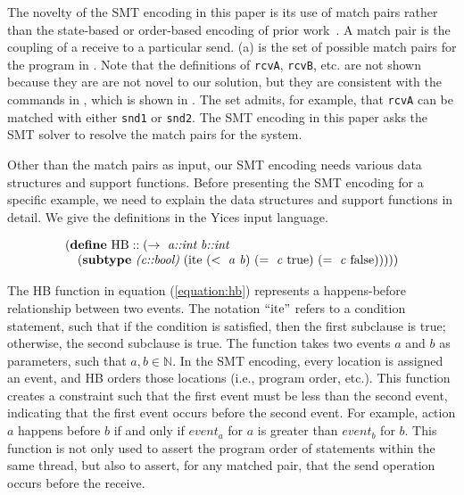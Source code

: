 The novelty of the SMT encoding in this paper is its use of match pairs rather than the state-based or order-based encoding of prior work~\cite{elwakil:padtad10,elwakil:atva10}. A match pair is the coupling of a receive to a particular send.  (a) is the set of possible match pairs for the program in . Note that the definitions of \texttt{rcvA}, \texttt{rcvB}, etc. are not shown because they are are not novel to our solution, but they are consistent with the commands in , which is shown in . The set admits, for example, that \texttt{rcvA} can be matched with either \texttt{snd1} or \texttt{snd2}. The SMT encoding in this paper asks the SMT solver to resolve the match pairs for the system.

Other than the match pairs as input, our SMT encoding needs various data structures and support functions. %
Before presenting the SMT encoding for a specific example, we need to explain the data structures and support functions in detail. We give the definitions in the Yices input language.

\begin{equation}
\begin{array}{l}
(\cfgt{define}\ \mathrm{HB}::(\rightarrow\ \cfgnt{a::int}\ \cfgnt{b::int}\\
\ \ \ (\cfgt{subtype}\ \cfgnt{(c::bool)}\ (\mathrm{ite}\ (<\ \mathit{a}\ \mathit{b})\ (=\ \mathit{c}\ \mathrm{true})\ (=\ \mathit{c}\ \mathrm{false})))))
\end{array}
\label{equation:hb}
\end{equation}


The HB function in equation (\ref{equation:hb}) represents a happens-before relationship between two events. The notation $``\mathrm{ite}"$ refers to a condition statement, such that if the condition is satisfied, then the first subclause is true; otherwise, the second subclause is true. The function takes two events $a$ and $b$ as parameters, such that $a,b \in \mathbb{N}$. In the SMT encoding, every location is assigned an event, and HB orders those locations (i.e., program order, etc.). This function creates a constraint such that the first event must be less than the second event, indicating that the first event occurs before the second event. For example, action $a$ happens before $b$ if and only if $\mathit{event}_a$ for $a$ is greater than $\mathit{event}_b$ for $b$. This function is not only used to assert the program order of statements within the same thread, but also to assert, for any matched pair, that the send operation
occurs before the receive.

